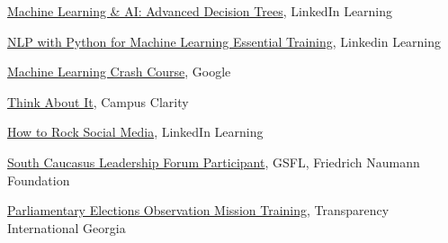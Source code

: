 \documentclass[a4paper,10pt,sans]{moderncv}
\begin{document}
         {\href{https://www.linkedin.com/learning/machine-learning-ai-advanced-decision-trees}{Machine Learning \& AI: Advanced Decision Trees}, LinkedIn Learning}

         {\href{https://www.linkedin.com/learning/nlp-with-python-for-machine-learning-essential-training}{NLP with Python for Machine Learning Essential Training}, Linkedin Learning}

         {\href{https://developers.google.com/machine-learning/crash-course/}{Machine Learning Crash Course}, Google}

         {\href{https://www.davidoniani.com/assets/certificates/campus-clarity.jpg}{Think About It}, Campus Clarity}

         {\href{http://www.linkedin.com/learning/how-to-rock-social-media}{How to Rock Social Media}, LinkedIn Learning}

         {\href{https://www.davidoniani.com/assets/certificates/south-caucasus-leadership-forum-2016.jpg}{South Caucasus Leadership Forum Participant}, GSFL, Friedrich Naumann Foundation}

         {\href{https://www.transparency.ge/en}{Parliamentary Elections Observation Mission Training}, Transparency International Georgia}


\end{document}
